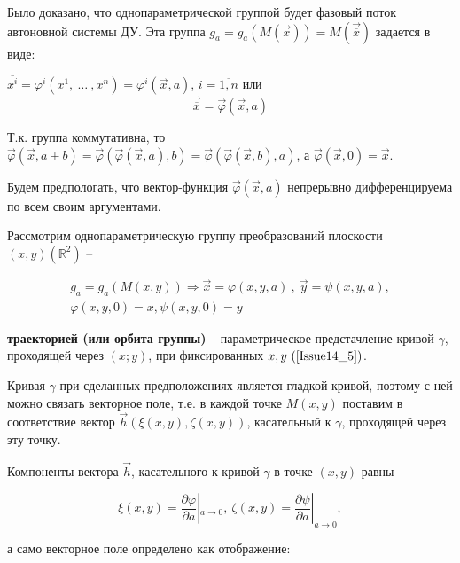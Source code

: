 Было доказано, что однопараметрической группой будет фазовый поток автоновной системы ДУ. Эта группа $g_a = g_a(M(\vec{x})) = M(\overrightarrow{\overline{x}})$ задается в виде:

$\overline{x^i} = \varphi^i(x^1,\ \dots\ ,x^n) = \varphi^i(\vec{x}, a)$, $i = \overline{1, n}$ или 
\begin{equation}
	\overrightarrow{\overline{x}} = \vec{\varphi}(\vec{x}, a)
	\label{Issue14_4}
\end{equation}

Т.к. группа коммутативна, то $\vec{\varphi}(\vec{x}, a + b) = \vec{\varphi}(\vec{\varphi}(\vec{x}, a), b) = \vec{\varphi}(\vec{\varphi}(\vec{x}, b), a)$, а $\vec{\varphi}(\vec{x}, 0) = \vec{x}$.

Будем предпологать, что вектор-функция $\vec{\varphi}(\vec{x}, a)$ непрерывно дифференцируема по всем своим аргументами.

Рассмотрим однопараметрическую группу преобразований плоскости $(x,y)(\mathbb{R}^2)$ --

\begin{equation}
	\begin{gathered}
		g_a = g_a(M(x,y)) \Rightarrow \vec{x} = \varphi(x,y,a)\ ,\ \vec{y} = \psi(x,y,a),\\
		\varphi(x,y,0) = x, \psi(x,y,0) = y
	\end{gathered}	
	\label{Issue14_5}
\end{equation}


\begin{definition}

\textbf{траекторией (или орбита группы)} -- параметрическое предстачление кривой $\gamma$, проходящей через $(x;y)$, при фиксированных $x,y\ (\ref{Issue14_5})$.

\end{definition}


Кривая $\gamma$ при сделанных предположениях является $\textbf{гладкой кривой}$, поэтому с ней можно связать векторное поле, т.е. в каждой точке $M(x,y)$ поставим в соответствие вектор $\vec{h}(\xi(x,y), \zeta(x,y))$, касательный к $\gamma$, проходящей через эту точку.

Компоненты вектора $\vec{h}$, касательного к кривой $\gamma$ в точке $(x,y)$ равны

\[ \xi(x,y) = \dfrac{\partial \varphi}{\partial a}|_{a \rightarrow 0},\ \zeta(x,y) = \dfrac{\partial \psi }{\partial a}|_{a \rightarrow 0}, \]

а само векторное поле определено как отображение:

